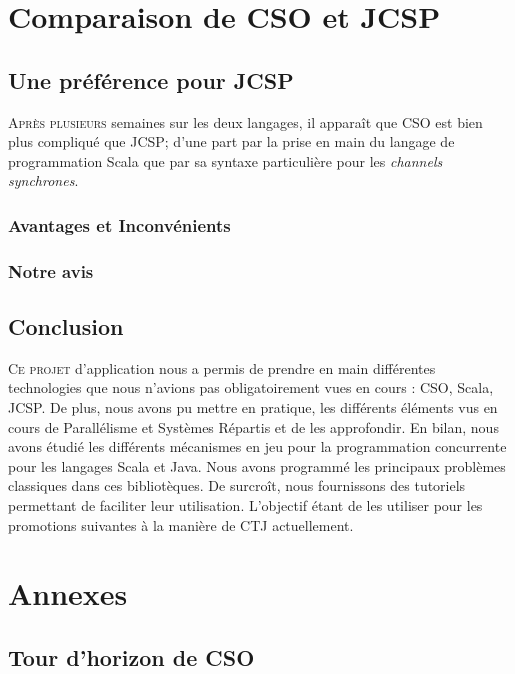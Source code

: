 \documentclass[a4paper,11pt,french]{report}
\begin{document}
\part{Comparaison de CSO et JCSP}
\chapter{Une préférence pour JCSP}

\lettrine{A}{près plusieurs} semaines sur les deux langages, il appara\^it que CSO est bien plus compliqué que JCSP; d'une part par la prise en main du langage de programmation Scala que par sa syntaxe particulière pour les \emph{channels synchrones}.\\

\section{Avantages et Inconvénients}
\section{Notre avis}

\chapter{Conclusion}

\lettrine{C}{e projet} d'application nous a permis de prendre en main différentes technologies que nous n'avions pas obligatoirement vues en cours : CSO, Scala, JCSP. De plus, nous avons pu mettre en pratique, les différents éléments vus en cours de Parallélisme et Systèmes Répartis et de les approfondir. En bilan, nous avons étudié les différents mécanismes en jeu pour la programmation concurrente pour les langages Scala et Java. Nous avons programmé les principaux problèmes classiques dans ces bibliotèques. De surcroît, nous fournissons des tutoriels permettant de faciliter leur utilisation. L'objectif étant de les utiliser pour les promotions suivantes à la manière de CTJ actuellement.

\part{Annexes}
\appendix
\chapter{ Tour d'horizon de CSO }
\label{chap:cso}
\end{document}
